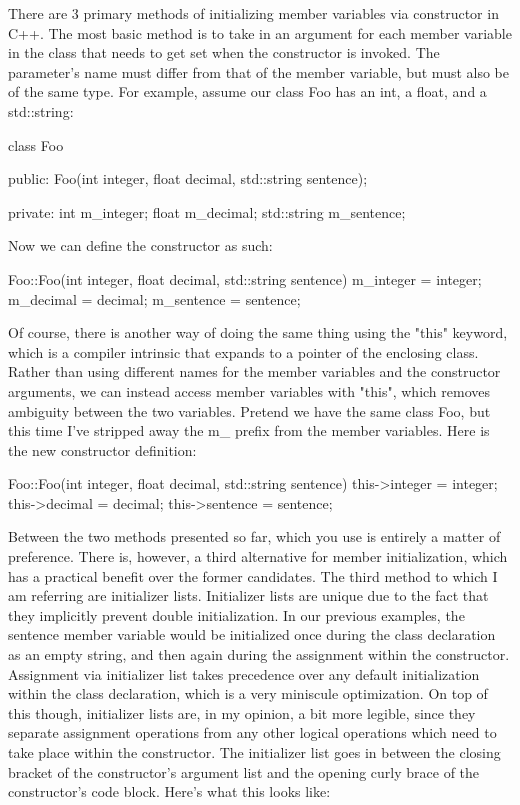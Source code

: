 \documentclass{article}
\begin{document}
There are 3 primary methods of initializing member variables via constructor in C++. The most basic method is
to take in an argument for each member variable in the class that needs to get set when the constructor is
invoked. The parameter's name must differ from that of the member variable, but must also be of the same type.
For example, assume our class Foo has an int, a float, and a std::string:

\begin{cpplst}
class Foo {
public:
    Foo(int integer, float decimal, std::string sentence);

private:
    int m_integer;
	float m_decimal;
	std::string m_sentence;
}
\end{cpplst}

Now we can define the constructor as such:

\begin{cpplst}
Foo::Foo(int integer, float decimal, std::string sentence)
{
    m_integer = integer;
	m_decimal = decimal;
	m_sentence = sentence;
}
\end{cpplst}

Of course, there is another way of doing the same thing using the "this" keyword, which is a compiler
intrinsic that expands to a pointer of the enclosing class. Rather than using different names for the member
variables and the constructor arguments, we can instead access member variables with "this", which removes
ambiguity between the two variables. Pretend we have the same class Foo, but this time I've stripped away the
m\_ prefix from the member variables. Here is the new constructor definition:

\begin{cpplst}
Foo::Foo(int integer, float decimal, std::string sentence)
{
    this->integer = integer;
	this->decimal = decimal;
	this->sentence = sentence;
}
\end{cpplst}

Between the two methods presented so far, which you use is entirely a matter of preference. There is, however,
a third alternative for member initialization, which has a practical benefit over the former candidates. The
third method to which I am referring are initializer lists. Initializer lists are unique due to the fact that
they implicitly prevent double initialization. In our previous examples, the sentence member variable would be
initialized once during the class declaration as an empty string, and then again during the assignment within
the constructor. Assignment via initializer list takes precedence over any default initialization within the
class declaration, which is a very miniscule optimization. On top of this though, initializer lists are, in my
opinion, a bit more legible, since they separate assignment operations from any other logical operations which
need to take place within the constructor. The initializer list goes in between the closing bracket of the
constructor's argument list and the opening curly brace of the constructor’s code block. Here's what this looks
like:
\end{document}
